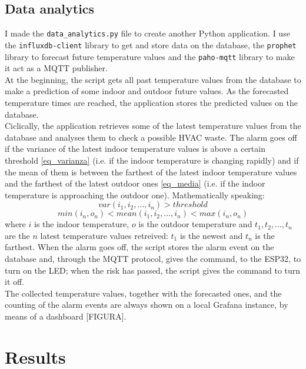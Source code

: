 \documentclass[conference]{IEEEtran}
\begin{document}
\subsection{Data analytics}
I made the \texttt{data\_analytics.py} file to create another Python application. I use the \texttt{influxdb-client} library to get and store data on the database, the \texttt{prophet} library to forecast future temperature values and the \texttt{paho-mqtt} library to make it act as a MQTT publisher.\\
At the beginning, the script gets all past temperature values from the database to make a prediction of some indoor and outdoor future values. As the forecasted temperature times are reached, the application stores the predicted values on the database.\\
Ciclically, the application retrieves some of the latest temperature values from the database and analyses them to check a possible HVAC waste. The alarm goes off if the variance of the latest indoor temperature values is above a certain threshold \eqref{eq_varianza} (i.e. if the indoor temperature is changing rapidly) and if the mean of them is between the farthest of the latest indoor temperature values and the farthest of the latest outdoor ones \eqref{eq_media} (i.e. if the indoor temperature is approaching the outdoor one). Mathematically speaking:
\begin{equation}
var(i_1, i_2, \dots, i_n) > threshold \label{eq_varianza}
\end{equation}
\begin{equation}
min(i_n, o_n) < mean(i_1, i_2, \dots, i_n) < max(i_n, o_n) \label{eq_media}
\end{equation}
where $i$ is the indoor temperature, $o$ is the outdoor temperature and $t_1, t_2, \dots, t_n$ are the $n$ latest temperature values retreived: $t_1$ is the newest and $t_n$ is the farthest. When the alarm goes off, the script stores the alarm event on the database and, through the MQTT protocol, gives the command, to the ESP32, to turn on the LED; when the risk has passed, the script gives the command to turn it off.\\
The collected temperature values, together with the forecasted ones, and the counting of the alarm events are always shown on a local Grafana instance, by means of a dashboard [FIGURA].


\section{Results}
\end{document}
